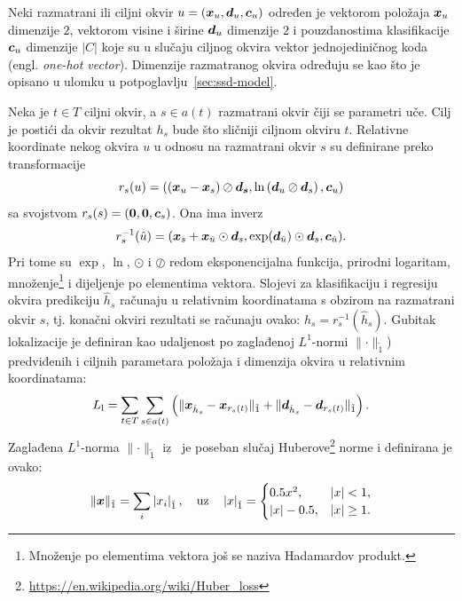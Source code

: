 \documentclass[utf8, seminar, numeric, lmodern]{feri}
\begin{document}
Neki razmatrani ili ciljni okvir $u=(\bm{x}_u, \bm{d}_u, \bm{c}_u)$ određen je vektorom položaja $\bm{x}_u$ dimenzije $2$, vektorom visine i širine $\bm{d}_u$ dimenzije $2$ i pouzdanostima klasifikacije $\bm{c}_u$ dimenzije $\left|C\right|$ koje su u slučaju ciljnog okvira vektor jednojediničnog koda (engl. \emph{one-hot vector}). Dimenzije razmatranog okvira određuju se kao što je opisano u ulomku  u potpoglavlju~\ref{sec:ssd-model}.

Neka je $t\in T$ ciljni okvir, a $s\in a(t)$ razmatrani okvir čiji se parametri uče. Cilj je postići da okvir rezultat $h_s$ bude što sličniji ciljnom okviru $t$. Relativne koordinate nekog okvira $u$ u odnosu na razmatrani okvir $s$ su definirane preko transformacije
\begin{equation}
r_s(u) = ((\bm{x}_u-\bm{x}_{s})\oslash\bm{d_s}, \ln\left(\bm{d}_u\oslash\bm{d}_s\right), \bm{c}_u)
\end{equation}
sa svojstvom $r_s(s) = (\bm{0}, \bm{0}, \bm{c}_s)$. Ona ima inverz
\begin{equation}
r^{-1}_s(\hat{u}) = (\bm{x}_s+\bm{x}_{\hat{u}}\odot\bm{d}_s, \exp(\bm{d}_{\hat{u}})\odot\bm{d}_s, \bm{c}_{\hat{u}}).
\end{equation}
Pri tome su $\exp$, $\ln$, $\odot$ i $\oslash$ redom eksponencijalna funkcija, prirodni logaritam, množenje\footnote{Množenje po elementima vektora još se naziva Hadamardov produkt.} i dijeljenje po elementima vektora. Slojevi za klasifikaciju i regresiju okvira predikciju $\hat{h}_s$ računaju u relativnim koordinatama s obzirom na razmatrani okvir $s$, tj. konačni okviri rezultati se računaju ovako: $h_s = r^{-1}_s(\hat{h}_s)$. Gubitak lokalizacije je definiran kao udaljenost po zaglađenoj $L^1$-normi $\lVert \mathord{\cdot} \rVert_{\tilde{1}}$) predviđenih i ciljnih parametara položaja i dimenzija okvira u relativnim koordinatama: 
\begin{equation}
L_\mathrm{l} = \sum_{t \in T} \sum_{s \in a(t)} \left(
\lVert \bm{x}_{\hat{h}_s} - \bm{x}_{r_s(t)}
\rVert_{\tilde{1}}
+ \lVert \bm{d}_{\hat{h}_s} - \bm{d}_{r_s(t)}
\rVert_{\tilde{1}} \right).
\end{equation}
Zaglađena $L^1$-norma $\lVert \mathord{\cdot} \rVert_{\tilde{1}}$ iz~\cite{fastrcnn} je poseban slučaj Huberove\footnote{\url{https://en.wikipedia.org/wiki/Huber_loss}} norme i definirana je ovako:
\begin{equation}
\lVert \bm{x} \rVert_{\tilde{1}} = \sum_i \left|x_i\right|_{\tilde{1}},  \quad\mathrm{uz}\quad 
\left|x\right|_{\tilde{1}} = 
\begin{cases} 
0.5 x^2, 				& \left|x\right| < 1 , \\
\left|x\right| - 0.5,	& \left|x\right| \geq 1 . \\
\end{cases}
\end{equation}
\end{document}
